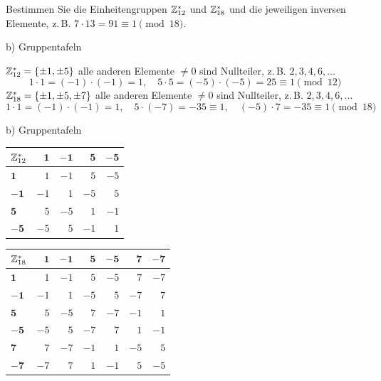 \begin{aufgabe}[Aufgabe 3]
Bestimmen Sie die Einheitengruppen $\mathbb{Z}_{12}^*$ und $\mathbb{Z}_{18}^*$ und die jeweiligen
inversen Elemente, z.\,B. $7 \cdot 13 = 91 \equiv 1 \pmod{18}$.

b) Gruppentafeln
\end{aufgabe}
\begin{loesung}
$\mathbb{Z}_{12}^* = \{\pm 1, \pm 5\}$ \qquad alle anderen Elemente $\neq 0$ sind Nullteiler, z.\,B. $2, 3, 4, 6, \dots$
\[
1\cdot 1 = (-1)\cdot(-1) = 1,\quad 5\cdot 5 = (-5)\cdot(-5) = 25 \equiv 1 \pmod{12}
\]
$\mathbb{Z}_{18}^* = \{\pm 1, \pm 5, \pm 7\}$ \qquad alle anderen Elemente $\neq 0$ sind Nullteiler, z.\,B. $2, 3, 4, 6, \dots$
\[
1\cdot 1 = (-1)\cdot(-1) = 1,\quad 5\cdot(-7) = -35 \equiv 1,\quad (-5)\cdot 7 = -35 \equiv 1 \pmod{18}
\]

b) Gruppentafeln

\begin{tabular}{l|rrrr}
\toprule
$\mathbb{Z}_{12}^*$ & $\mathbf{1}$ & $\mathbf{-1}$ & $\mathbf{5}$ & $\mathbf{-5}$\\
\midrule
$\mathbf{1}$  & $1$  & $-1$ & $5$  & $-5$\\
$\mathbf{-1}$ & $-1$ & $1$  & $-5$ & $5$\\
$\mathbf{5}$  & $5$  & $-5$ & $1$  & $-1$\\
$\mathbf{-5}$ & $-5$ & $5$  & $-1$ & $1$\\
\bottomrule
\end{tabular}

\medskip
\begin{tabular}{l|rrrrrr}
\toprule
$\mathbb{Z}_{18}^*$ & $\mathbf{1}$ & $\mathbf{-1}$ & $\mathbf{5}$ & $\mathbf{-5}$ & $\mathbf{7}$ & $\mathbf{-7}$\\
\midrule
$\mathbf{1}$  & $1$  & $-1$ & $5$  & $-5$ & $7$  & $-7$\\
$\mathbf{-1}$ & $-1$ & $1$  & $-5$ & $5$  & $-7$ & $7$\\
$\mathbf{5}$  & $5$  & $-5$ & $7$  & $-7$ & $-1$ & $1$\\
$\mathbf{-5}$ & $-5$ & $5$  & $-7$ & $7$  & $1$  & $-1$\\
$\mathbf{7}$  & $7$  & $-7$ & $-1$ & $1$  & $-5$ & $5$\\
$\mathbf{-7}$ & $-7$ & $7$  & $1$  & $-1$ & $5$  & $-5$\\
\bottomrule
\end{tabular}
\end{loesung}

